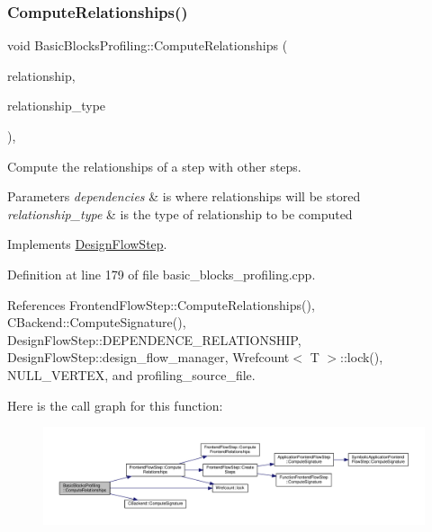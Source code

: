 \subsubsection{\texorpdfstring{Compute\+Relationships()}{ComputeRelationships()}}
{\footnotesize\ttfamily void Basic\+Blocks\+Profiling\+::\+Compute\+Relationships (\begin{DoxyParamCaption}\item[{\hyperlink{classDesignFlowStepSet}{Design\+Flow\+Step\+Set} \&}]{relationship,  }\item[{const \hyperlink{classDesignFlowStep_a723a3baf19ff2ceb77bc13e099d0b1b7}{Design\+Flow\+Step\+::\+Relationship\+Type}}]{relationship\+\_\+type }\end{DoxyParamCaption})\hspace{0.3cm}{\ttfamily [override]}, {\ttfamily [virtual]}}



Compute the relationships of a step with other steps. 


\begin{DoxyParams}{Parameters}
{\em dependencies} & is where relationships will be stored \\
\hline
{\em relationship\+\_\+type} & is the type of relationship to be computed \\
\hline
\end{DoxyParams}


Implements \hyperlink{classDesignFlowStep_a65bf7bcb603189a7ddcf930c3a9fd7fe}{Design\+Flow\+Step}.



Definition at line 179 of file basic\+\_\+blocks\+\_\+profiling.\+cpp.



References Frontend\+Flow\+Step\+::\+Compute\+Relationships(), C\+Backend\+::\+Compute\+Signature(), Design\+Flow\+Step\+::\+D\+E\+P\+E\+N\+D\+E\+N\+C\+E\+\_\+\+R\+E\+L\+A\+T\+I\+O\+N\+S\+H\+IP, Design\+Flow\+Step\+::design\+\_\+flow\+\_\+manager, Wrefcount$<$ T $>$\+::lock(), N\+U\+L\+L\+\_\+\+V\+E\+R\+T\+EX, and profiling\+\_\+source\+\_\+file.

Here is the call graph for this function\+:
\nopagebreak
\begin{figure}[H]
\begin{center}
\leavevmode
\includegraphics[width=350pt]{dc/d17/classBasicBlocksProfiling_a7fe35844cefbb68704d111f34b356df0_cgraph}
\end{center}
\end{figure}
\mbox{\label{classBasicBlocksProfiling_a3a818424991cbd10f25d89e2f2d0417d}} 
